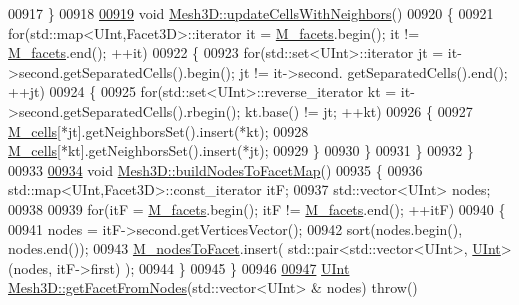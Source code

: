 \begin{DoxyCode}
00917 \}
00918 
\hypertarget{Mesh3D_8cpp_source.tex_l00919}{}\hyperlink{classFVCode3D_1_1Mesh3D_a32920906ccad9ef0572ebc4009214c86}{00919} \textcolor{keywordtype}{void} \hyperlink{classFVCode3D_1_1Mesh3D_a32920906ccad9ef0572ebc4009214c86}{Mesh3D::updateCellsWithNeighbors}()
00920 \{
00921     \textcolor{keywordflow}{for}(std::map<UInt,Facet3D>::iterator it = \hyperlink{classFVCode3D_1_1Mesh3D_a57d8b6af7f4385d749c2d83c235764de}{M\_facets}.begin(); it != 
      \hyperlink{classFVCode3D_1_1Mesh3D_a57d8b6af7f4385d749c2d83c235764de}{M\_facets}.end(); ++it)
00922     \{
00923         \textcolor{keywordflow}{for}(std::set<UInt>::iterator jt = it->second.getSeparatedCells().begin(); jt != it->second.
      getSeparatedCells().end(); ++jt)
00924         \{
00925             \textcolor{keywordflow}{for}(std::set<UInt>::reverse\_iterator kt = it->second.getSeparatedCells().rbegin(); kt.base() !=
       jt; ++kt)
00926             \{
00927                 \hyperlink{classFVCode3D_1_1Mesh3D_a8cac877e809226fb96078183efb25a2f}{M\_cells}[*jt].getNeighborsSet().insert(*kt);
00928                 \hyperlink{classFVCode3D_1_1Mesh3D_a8cac877e809226fb96078183efb25a2f}{M\_cells}[*kt].getNeighborsSet().insert(*jt);
00929             \}
00930         \}
00931     \}
00932 \}
00933 
\hypertarget{Mesh3D_8cpp_source.tex_l00934}{}\hyperlink{classFVCode3D_1_1Mesh3D_a609f980329f5a98e9fad724049e509d2}{00934} \textcolor{keywordtype}{void} \hyperlink{classFVCode3D_1_1Mesh3D_a609f980329f5a98e9fad724049e509d2}{Mesh3D::buildNodesToFacetMap}()
00935 \{
00936     std::map<UInt,Facet3D>::const\_iterator itF;
00937     std::vector<UInt> nodes;
00938 
00939     \textcolor{keywordflow}{for}(itF = \hyperlink{classFVCode3D_1_1Mesh3D_a57d8b6af7f4385d749c2d83c235764de}{M\_facets}.begin(); itF != \hyperlink{classFVCode3D_1_1Mesh3D_a57d8b6af7f4385d749c2d83c235764de}{M\_facets}.end(); ++itF)
00940     \{
00941         nodes = itF->second.getVerticesVector();
00942         sort(nodes.begin(), nodes.end());
00943         \hyperlink{classFVCode3D_1_1Mesh3D_add5bb503fb6d9bf6ee0656f02e712b06}{M\_nodesToFacet}.insert( std::pair<std::vector<UInt>, \hyperlink{namespaceFVCode3D_a4bf7e328c75d0fd504050d040ebe9eda}{UInt}>(nodes, itF->first) );
00944     \}
00945 \}
00946 
\hypertarget{Mesh3D_8cpp_source.tex_l00947}{}\hyperlink{classFVCode3D_1_1Mesh3D_a2ac0b84c13a15ed42cdd8c98066eae98}{00947} \hyperlink{namespaceFVCode3D_a4bf7e328c75d0fd504050d040ebe9eda}{UInt} \hyperlink{classFVCode3D_1_1Mesh3D_a2ac0b84c13a15ed42cdd8c98066eae98}{Mesh3D::getFacetFromNodes}(std::vector<UInt> & nodes) \textcolor{keywordflow}{throw}()

\end{DoxyCode}
